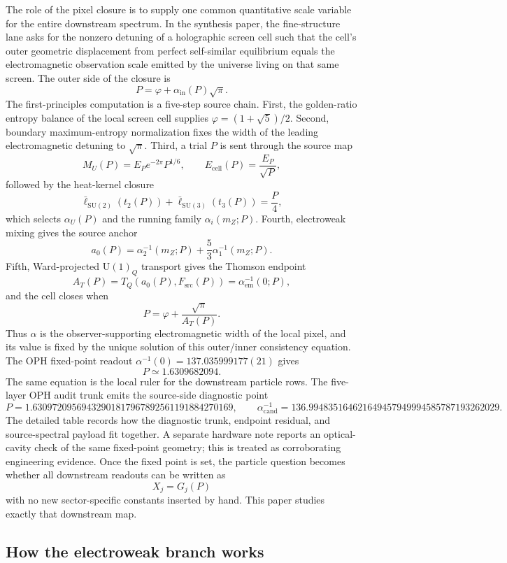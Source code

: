 \documentclass[11pt]{article}
\newcommand{\U}{\mathrm{U}}
\begin{document}
The role of the pixel closure is to supply one common quantitative scale
variable for the entire downstream spectrum. In the synthesis paper, the
fine-structure lane asks for the nonzero detuning of a holographic screen cell
such that the cell's outer geometric displacement from perfect self-similar
equilibrium equals the electromagnetic observation scale emitted by the
universe living on that same screen.
The outer side of the closure is
\[
P=\varphi+\alpha_{\mathrm{in}}(P)\sqrt{\pi}.
\]
The first-principles computation is a five-step source chain. First, the
golden-ratio entropy balance of the local screen cell supplies
\(\varphi=(1+\sqrt5)/2\). Second, boundary maximum-entropy normalization fixes
the width of the leading electromagnetic detuning to \(\sqrt{\pi}\). Third, a
trial \(P\) is sent through the source map
\[
M_U(P)=E_P e^{-2\pi}P^{1/6},\qquad E_{\mathrm{cell}}(P)=\frac{E_P}{\sqrt P},
\]
followed by the heat-kernel closure
\[
\bar\ell_{\mathrm{SU}(2)}(t_2(P))+\bar\ell_{\mathrm{SU}(3)}(t_3(P))=\frac{P}{4},
\]
which selects \(\alpha_U(P)\) and the running family
\(\alpha_i(m_Z;P)\). Fourth, electroweak mixing gives the source anchor
\[
a_0(P)=\alpha_2^{-1}(m_Z;P)+\frac53\alpha_1^{-1}(m_Z;P).
\]
Fifth, Ward-projected \(\U(1)_Q\) transport gives the Thomson endpoint
\[
A_T(P)=T_Q(a_0(P),F_{\mathrm{src}}(P))=\alpha_{\mathrm{em}}^{-1}(0;P),
\]
and the cell closes when
\[
P=\varphi+\frac{\sqrt{\pi}}{A_T(P)}.
\]
Thus \(\alpha\) is the observer-supporting electromagnetic width of the local
pixel, and its value is fixed by the unique solution of this outer/inner
consistency equation.
The OPH fixed-point readout
\(\alpha^{-1}(0)=137.035999177(21)\) gives
\[
P\simeq1.6309682094.
\]
The same equation is the local ruler for the downstream particle rows. The five-layer
OPH audit trunk emits the source-side diagnostic point
\[
P=1.63097209569432901817967892561191884270169,
\qquad
\alpha_{\mathrm{cand}}^{-1}=136.994835164621649457949994585787193262029.
\]
The detailed table records how the diagnostic trunk, endpoint residual, and
source-spectral payload fit together.
A separate hardware note reports an optical-cavity check of the same fixed-point geometry;
this is treated as corroborating engineering evidence.
Once the fixed point is set, the particle question becomes whether all downstream readouts
can be written as
\[
X_j = G_j(P)
\]
with no new sector-specific constants inserted by hand. This paper studies exactly that downstream
map.

\subsection{How the electroweak branch works}
\end{document}
